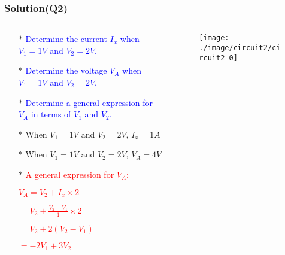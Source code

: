 \documentclass{beamer}
\newcommand{\blue}[1]{\textcolor{blue}{#1}}
\newcommand{\red}[1]{\textcolor{red}{#1}}
\begin{document}

\begin{frame}
\frametitle{Solution(Q2)}
\begin{columns}
\begin{column}{7.5cm}
\begin{itemize} \itemsep1pt \parskip0pt 
  \item[$\ast$]\blue{Determine the current $I_x$ when \newline $V_1 = 1V$ and $V_2 = 2V$.}
  \item[$\ast$]\blue{Determine the voltage $V_A$ when \newline $V_1 = 1V$ and $V_2 = 2V$.}
  \item[$\ast$]\blue{Determine a general expression \newline for $V_A$ in terms of $V_1$ and $V_2$.}
\end{itemize}

\begin{itemize} \itemsep1pt \parskip0pt 
  \item[$\ast$] When $V_1 = 1V$ and $V_2 = 2V$, $I_x = 1A$
  \item[$\ast$] When $V_1 = 1V$ and $V_2 = 2V$, $V_A = 4V$
  \item[$\ast$] \red{A general expression for $V_A$:}
  \item[] \hspace{8 mm}\red{$V_A = V_2 + I_x \times 2$}
  \item[] \hspace{14 mm}\red{$=V_2 + \frac{V_2-V_1}{1} \times 2$}
  \item[] \hspace{14 mm}\red{$=V_2 + 2(V_2 - V_1)$}
  \item[] \hspace{14 mm}\red{$=-2V_1 + 3V_2$}
\end{itemize}


\end{column}

\begin{column}{5cm}
\begin{figure}[H]
  \centering
  \texttt{[image: ./image/circuit2/circuit2\_0]}
\end{figure}
\end{column}
\end{columns}

\end{frame}
\end{document}
